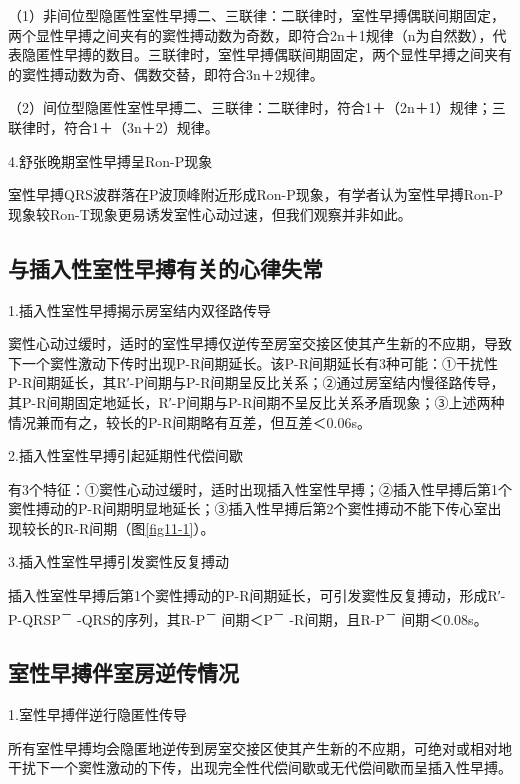 （1）非间位型隐匿性室性早搏二、三联律：二联律时，室性早搏偶联间期固定，两个显性早搏之间夹有的窦性搏动数为奇数，即符合2n＋1规律（n为自然数），代表隐匿性早搏的数目。三联律时，室性早搏偶联间期固定，两个显性早搏之间夹有的窦性搏动数为奇、偶数交替，即符合3n＋2规律。

（2）间位型隐匿性室性早搏二、三联律：二联律时，符合1＋（2n＋1）规律；三联律时，符合1＋（3n＋2）规律。

4.舒张晚期室性早搏呈Ron-P现象

室性早搏QRS波群落在P波顶峰附近形成Ron-P现象，有学者认为室性早搏Ron-P现象较Ron-T现象更易诱发室性心动过速，但我们观察并非如此。

\protect\hypertarget{text00018.htmlux5cux23subid154}{}{}

\subsection{与插入性室性早搏有关的心律失常}

1.插入性室性早搏揭示房室结内双径路传导

窦性心动过缓时，适时的室性早搏仅逆传至房室交接区使其产生新的不应期，导致下一个窦性激动下传时出现P-R间期延长。该P-R间期延长有3种可能：①干扰性P-R间期延长，其R′-P间期与P-R间期呈反比关系；②通过房室结内慢径路传导，其P-R间期固定地延长，R′-P间期与P-R间期不呈反比关系矛盾现象；③上述两种情况兼而有之，较长的P-R间期略有互差，但互差＜0.06s。

2.插入性室性早搏引起延期性代偿间歇

有3个特征：①窦性心动过缓时，适时出现插入性室性早搏；②插入性早搏后第1个窦性搏动的P-R间期明显地延长；③插入性早搏后第2个窦性搏动不能下传心室出现较长的R-R间期（图\ref{fig11-1}）。

3.插入性室性早搏引发窦性反复搏动

插入性室性早搏后第1个窦性搏动的P-R间期延长，可引发窦性反复搏动，形成R′-P-QRSP\textsuperscript{－}
-QRS的序列，其R-P\textsuperscript{－} 间期＜P\textsuperscript{－}
-R间期，且R-P\textsuperscript{－} 间期＜0.08s。

\protect\hypertarget{text00018.htmlux5cux23subid155}{}{}

\subsection{室性早搏伴室房逆传情况}

1.室性早搏伴逆行隐匿性传导

所有室性早搏均会隐匿地逆传到房室交接区使其产生新的不应期，可绝对或相对地干扰下一个窦性激动的下传，出现完全性代偿间歇或无代偿间歇而呈插入性早搏。

